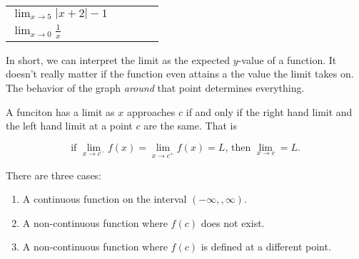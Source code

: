 \documentclass[addpoints, 12pt]{exam}
\begin{document}
\begin{longtable}[ht]{|C{2.5cm}|C{6.6cm}|C{1.75cm}|C{1.75cm}|C{1.75cm}|}
 & & & \\\hline
    $\displaystyle\lim_{x\to 5}|x+2|-1$ &  & & & \\\hline
    $\displaystyle\lim_{x\to0}\frac{1}{x}$ &  & & & \\\hline
\end{longtable}
In short, we can interpret the limit as the expected $y$-value of a function. It doesn't really matter if the function even attains a the value the limit takes on. The behavior of the graph \textit{around} that point determines everything.

\newpage

\begin{tcolorbox}[title= DEFINITION OF THE EXISTENCE OF A LIMIT,black,sharp corners,colback=white,colbacktitle=white,coltitle=black,boxrule=1pt]

    A funciton has a limit as $x$ approaches $c$ if and only if the right hand limit and the left hand limit at a point $c$ are the same. That is
    
    \[\text{if }\lim_{x\to c^-}f(x)=\lim_{x\to c^+}f(x)=L,\,\text{then }\lim_{x\to c}=L.\]
\end{tcolorbox}
\vspace{.3cm}
\noindent There are three cases:
\begin{enumerate}
    \item A continuous function on the interval $(-\infty,
    ,\infty)$. \vspace{.75cm}
    \item A non-continuous function where $f(c)$ does not exist. \vspace{.75cm}
    \item A non-continuous function where $f(c)$ is defined at a different point.\vspace{.75cm}
\end{enumerate}
\end{document}
